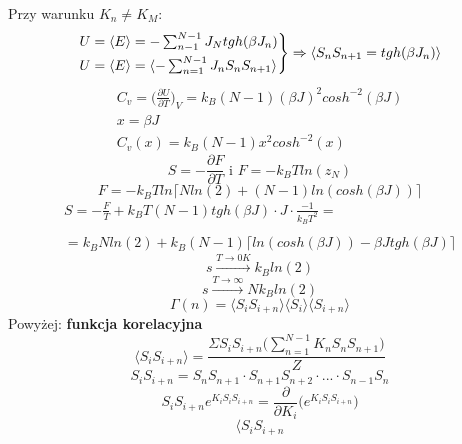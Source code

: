 \documentclass{article}
\begin{document}
		Przy warunku $ K_n \neq K_M $:
		\begin{equation}
		\begin{rcases}
			U = \langle E \rangle = - \sum_{n-1}^{N-1} J_N tgh(\beta J_n) \\
			U = \langle E \rangle = \langle - \sum_{n=1}^{N-1} J_n S_n S_{n+1}\rangle
		\end{rcases} \Rightarrow \langle S_nS_{n+1} = tgh(\beta J_n)\rangle
		\end{equation}
		\begin{equation}
		\begin{array}{cc}
			C_v = \bigg( \frac{\partial U}{\partial T} \bigg)_V = k_B(N-1)(\beta J)^2cosh^{-2}(\beta J)
			\\
			x = \beta J
			\\
			C_v(x) = k_B(N-1)x^2cosh^{-2}(x)
		\end{array}
		\end{equation}
		\begin{equation}
		S = -\frac{\partial F}{\partial T} \text{ i }F = -k_BTln(z_N)
		\end{equation}
		\begin{equation}
			F = -k_BTln \lceil Nln(2) + (N-1)ln(cosh(\beta J)) \rceil
		\end{equation}
		\begin{equation}
		\begin{array}{cc}
			S = -\frac{F}{T} + k_BT(N-1)tgh(\beta J)\cdot J \cdot \frac{-1}{k_BT^2} = \\ \\
			 = k_BNln(2) + k_B(N-1)\lceil ln(cosh(\beta J)) - \beta J tgh(\beta J) \rceil
		\end{array}
		\end{equation}
		\begin{equation}
			s \xrightarrow{T \rightarrow 0K} k_Bln(2)	
		\end{equation}
		\begin{equation}
			s \xrightarrow{T \rightarrow \infty} Nk_Bln(2)	
		\end{equation}
		\begin{equation}
			\Gamma(n) = \langle S_iS_{i+n} \rangle \langle S_i \rangle \langle S_{i+n} \rangle 
		\end{equation}
		Powyżej: \textbf{funkcja korelacyjna}
		\begin{equation}
			\langle S_iS_{i+n}\rangle = \frac
			{\Sigma S_iS_{i+n} \Bigg( \sum_{n=1}^{N-1}K_nS_nS_{n+1}\Bigg)}
			{Z}
		\end{equation}
		\begin{equation}
		S_iS_{i+n} = S_nS_{n+1}\cdot S_{n+1}S_{n+2} \cdot ... \cdot S_{n-1}S_n
		\end{equation}
		\begin{equation}
			S_iS_{i+n}e^{K_iS_iS_{i+n}} = \frac{\partial}{\partial K_i}\bigg( e^{K_iS_iS_{i+n}} \bigg)
		\end{equation}
		\begin{equation}
		\langle S_i S_{i + n}
		\end{equation}
\end{document}
